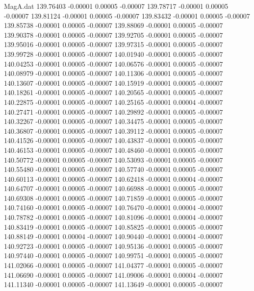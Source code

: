 \begin{filecontents}{MagA.dat}
 139.76403   -0.00001    0.00005   -0.00007
 139.78717   -0.00001    0.00005   -0.00007
 139.81124   -0.00001    0.00005   -0.00007
 139.83432   -0.00001    0.00005   -0.00007
 139.85738   -0.00001    0.00005   -0.00007
 139.88069   -0.00001    0.00005   -0.00007
 139.90378   -0.00001    0.00005   -0.00007
 139.92705   -0.00001    0.00005   -0.00007
 139.95016   -0.00001    0.00005   -0.00007
 139.97315   -0.00001    0.00005   -0.00007
 139.99728   -0.00001    0.00005   -0.00007
 140.01940   -0.00001    0.00005   -0.00007
 140.04253   -0.00001    0.00005   -0.00007
 140.06576   -0.00001    0.00005   -0.00007
 140.08979   -0.00001    0.00005   -0.00007
 140.11306   -0.00001    0.00005   -0.00007
 140.13607   -0.00001    0.00005   -0.00007
 140.15919   -0.00001    0.00005   -0.00007
 140.18261   -0.00001    0.00005   -0.00007
 140.20565   -0.00001    0.00005   -0.00007
 140.22875   -0.00001    0.00005   -0.00007
 140.25165   -0.00001    0.00004   -0.00007
 140.27471   -0.00001    0.00005   -0.00007
 140.29892   -0.00001    0.00005   -0.00007
 140.32267   -0.00001    0.00005   -0.00007
 140.34475   -0.00001    0.00005   -0.00007
 140.36807   -0.00001    0.00005   -0.00007
 140.39112   -0.00001    0.00005   -0.00007
 140.41526   -0.00001    0.00005   -0.00007
 140.43837   -0.00001    0.00005   -0.00007
 140.46153   -0.00001    0.00005   -0.00007
 140.48460   -0.00001    0.00005   -0.00007
 140.50772   -0.00001    0.00005   -0.00007
 140.53093   -0.00001    0.00005   -0.00007
 140.55480   -0.00001    0.00005   -0.00007
 140.57740   -0.00001    0.00005   -0.00007
 140.60113   -0.00001    0.00005   -0.00007
 140.62418   -0.00001    0.00004   -0.00007
 140.64707   -0.00001    0.00005   -0.00007
 140.66988   -0.00001    0.00005   -0.00007
 140.69308   -0.00001    0.00005   -0.00007
 140.71859   -0.00001    0.00005   -0.00007
 140.74160   -0.00001    0.00005   -0.00007
 140.76470   -0.00001    0.00004   -0.00007
 140.78782   -0.00001    0.00005   -0.00007
 140.81096   -0.00001    0.00004   -0.00007
 140.83419   -0.00001    0.00005   -0.00007
 140.85825   -0.00001    0.00005   -0.00007
 140.88149   -0.00001    0.00004   -0.00007
 140.90440   -0.00001    0.00004   -0.00007
 140.92723   -0.00001    0.00005   -0.00007
 140.95136   -0.00001    0.00005   -0.00007
 140.97440   -0.00001    0.00005   -0.00007
 140.99751   -0.00001    0.00005   -0.00007
 141.02066   -0.00001    0.00005   -0.00007
 141.04377   -0.00001    0.00005   -0.00007
 141.06690   -0.00001    0.00005   -0.00007
 141.09006   -0.00001    0.00004   -0.00007
 141.11340   -0.00001    0.00005   -0.00007
 141.13649   -0.00001    0.00005   -0.00007

\end{filecontents}
